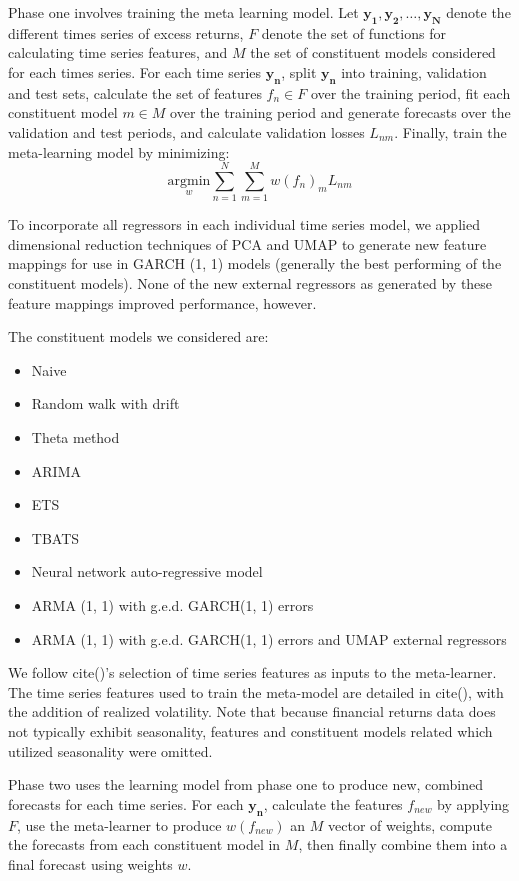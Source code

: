 \documentclass{article}
\begin{document}
Phase one involves training the meta learning model. Let $\mathbf{y_1}, \mathbf{y_2}, \dots, \mathbf{y_N}$ denote the different times series of excess returns, $F$ denote the set of functions for calculating time series features, and $M$ the set of constituent models considered for each times series. For each time series $\mathbf{y_n}$, split $\mathbf{y_n}$ into training, validation and test sets, calculate the set of features $f_n \in F$ over the training period, fit each constituent model $m \in M$ over the training period and generate forecasts over the validation and test periods, and calculate validation losses $L_{nm}$. Finally, train the meta-learning model by minimizing:
\begin{equation}
\underset{w}{\text{argmin}} \sum_{n = 1}^{N} \sum_{m = 1}^{M} w(f_n)_m L_{nm}
\end{equation}

To incorporate all regressors in each individual time series model, we applied dimensional reduction techniques of PCA and UMAP to generate new feature mappings for use in GARCH (1, 1) models (generally the best performing of the constituent models). None of the new external regressors as generated by these feature mappings improved performance, however.

The constituent models we considered are:
\begin{itemize}
	\item Naive
	\item Random walk with drift
	\item Theta method
	\item ARIMA
	\item ETS
	\item TBATS
	\item Neural network auto-regressive model
	\item ARMA (1, 1) with g.e.d. GARCH(1, 1) errors
	\item ARMA (1, 1) with g.e.d. GARCH(1, 1) errors and UMAP external regressors
\end{itemize}
We follow cite()'s selection of time series features as inputs to the meta-learner. The time series features used to train the meta-model are detailed in cite(), with the addition of realized volatility. Note that because financial returns data does not typically exhibit seasonality, features and constituent models related which utilized seasonality were omitted.

Phase two uses the learning model from phase one to produce new, combined forecasts for each time series. For each $\mathbf{y_n}$, calculate the features $f_{new}$ by applying $F$, use the meta-learner to produce $w(f_{new})$ an $M$ vector of weights, compute the forecasts from each constituent model in $M$, then finally combine them into a final forecast using weights $w$.
\end{document}
